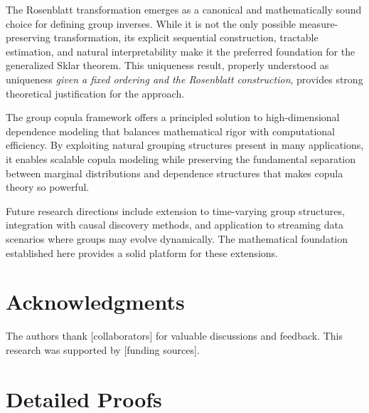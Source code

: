 The Rosenblatt transformation emerges as a canonical and mathematically sound choice for defining group inverses. While it is not the only possible measure-preserving transformation, its explicit sequential construction, tractable estimation, and natural interpretability make it the preferred foundation for the generalized Sklar theorem. This uniqueness result, properly understood as uniqueness \emph{given a fixed ordering and the Rosenblatt construction}, provides strong theoretical justification for the approach.

The group copula framework offers a principled solution to high-dimensional dependence modeling that balances mathematical rigor with computational efficiency. By exploiting natural grouping structures present in many applications, it enables scalable copula modeling while preserving the fundamental separation between marginal distributions and dependence structures that makes copula theory so powerful.

Future research directions include extension to time-varying group structures, integration with causal discovery methods, and application to streaming data scenarios where groups may evolve dynamically. The mathematical foundation established here provides a solid platform for these extensions.

\section{Acknowledgments}
The authors thank [collaborators] for valuable discussions and feedback. This research was supported by [funding sources].

\section{Detailed Proofs}
